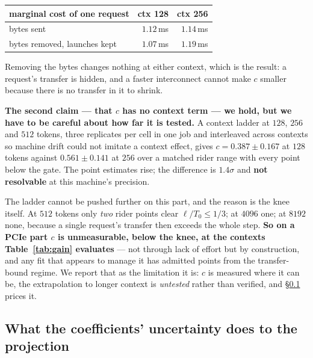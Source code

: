 \begin{center}\small
\begin{tabular}{lrr}
\toprule
marginal cost of one request & ctx 128 & ctx 256 \\
\midrule
bytes sent & $1.12$\,ms & $1.14$\,ms \\
bytes removed, launches kept & $1.07$\,ms & $1.19$\,ms \\
\bottomrule
\end{tabular}
\end{center}

Removing the bytes changes nothing at either context, which is the result: a
request's transfer is hidden, and a faster interconnect cannot make $c$ smaller
because there is no transfer in it to shrink.

\textbf{The second claim --- that $c$ has no context term --- we hold, but we have
to be careful about how far it is tested.} A context ladder at $128$, $256$ and
$512$ tokens, three replicates per cell in one job and interleaved across contexts
so machine drift could not imitate a context effect, gives $c = 0.387 \pm 0.167$ at
$128$ tokens against $0.561 \pm 0.141$ at $256$ over a matched rider range with
every point below the gate. The point estimates rise; the difference is
$1.4\sigma$ and \textbf{not resolvable} at this machine's precision.

The ladder cannot be pushed further on this part, and the reason is the knee itself.
At $512$ tokens only \emph{two} rider points clear $\ell/T_0 \le 1/3$; at $4096$
one; at $8192$ none, because a single request's transfer then exceeds the whole
step. \textbf{So on a PCIe part $c$ is unmeasurable, below the knee, at the contexts
Table~\ref{tab:gain} evaluates} --- not through lack of effort but by construction,
and any fit that appears to manage it has admitted points from the transfer-bound
regime. We report that as the limitation it is: $c$ is measured where it can be, the
extrapolation to longer context is \emph{untested} rather than verified, and
\S\ref{sec:eval:sens} prices it.

\subsection{What the coefficients' uncertainty does to the projection}
\label{sec:eval:sens}

